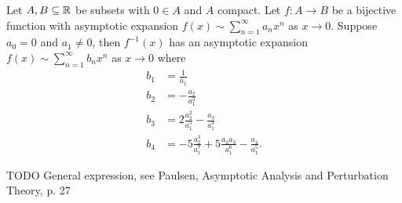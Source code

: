\begin{proposition}
Let $A,B\subseteq \mathbb{R}$ be subsets with $0\in A$ and $A$ compact. Let $f: A \to B$ be a bijective function with asymptotic expansion $f(x) \sim \sum_{n=1}^\infty a_n x^n$ as $x\to 0$. Suppose $a_0 = 0$ and $a_1 \neq 0$, then $f^{-1}(x)$ has an asymptotic expansion $f(x) \sim \sum_{n=1}^\infty b_n x^n$ as $x\to 0$ where
\begin{align*}
b_1 &= \frac{1}{a_1} \\
b_2 &= - \frac{a_2}{a_1^3} \\
b_3 &= 2\frac{a_2^2}{a_1^5} - \frac{a_3}{a_1^4} \\
b_4 &= - 5\frac{a_2^3}{a_1^7} + 5\frac{a_2a_3}{a_1^6} - \frac{a_4}{a_1^5}.
\end{align*}
\end{proposition}
TODO General expression, see Paulsen, Asymptotic Analysis and Perturbation Theory, p. 27
